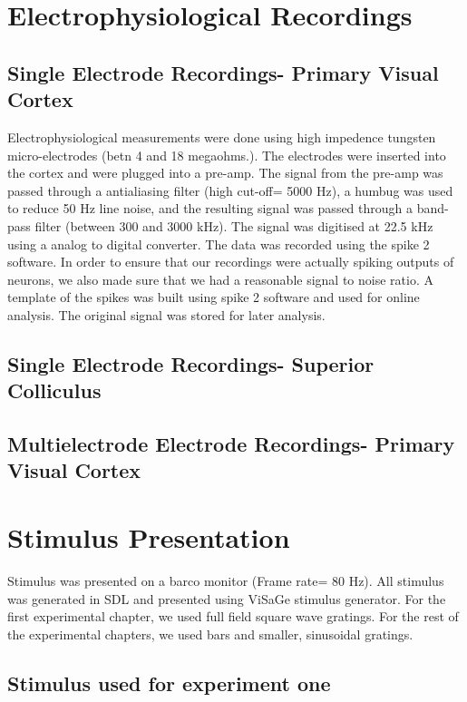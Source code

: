 \section{Electrophysiological Recordings}
	\subsection{Single Electrode Recordings- Primary Visual Cortex}

Electrophysiological measurements were done using high impedence tungsten micro-electrodes (betn 4 and 18 megaohms.). The electrodes were inserted into the cortex and were plugged into a pre-amp. The signal from the pre-amp was passed through a antialiasing filter (high cut-off= 5000 Hz), a humbug was used to reduce 50 Hz line noise, and the resulting signal was passed through a band-pass filter (between 300 and 3000 kHz). The signal was digitised at 22.5 kHz using a analog to digital converter. The data was recorded using the spike 2 software. In order to ensure that our recordings were actually spiking outputs of neurons, we also made sure that we had a reasonable signal to noise ratio. A template of the spikes was built using spike 2 software and used for online analysis. The original signal was stored for later analysis.
	\subsection{Single Electrode Recordings- Superior Colliculus}
	
	\subsection{Multielectrode Electrode Recordings- Primary Visual Cortex}
	
\section{Stimulus Presentation}

Stimulus was presented on a barco monitor (Frame rate= 80 Hz). All stimulus was generated in SDL and presented using ViSaGe stimulus generator. For the first experimental chapter, we used full field square wave gratings. For the rest of the experimental chapters, we used bars and smaller, sinusoidal gratings.

\subsection{Stimulus used for experiment one}

